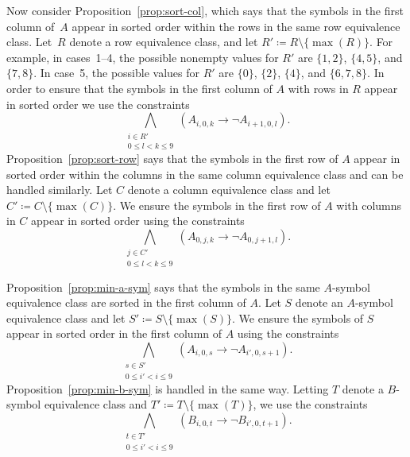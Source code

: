 \documentclass[runningheads]{llncs}
\newcommand{\limp}{\mathbin\rightarrow}
\begin{document}
Now consider Proposition~\ref{prop:sort-col}, which says that the symbols in the
first column of~$A$ appear in sorted order within the rows in the same row
equivalence class.
Let~$R$ denote a row equivalence class, and let $R'\coloneqq R\setminus\{\max(R)\}$.  For example,
in cases~1--4, the possible nonempty values for $R'$ are $\{1,2\}$, $\{4,5\}$, and $\{7,8\}$.
In case~5, the possible values for $R'$ are $\{0\}$, $\{2\}$, $\{4\}$, and $\{6,7,8\}$.
In order to ensure that the symbols in the first column of $A$ with rows in $R$ appear in sorted order we
use the constraints
\begin{equation} \bigwedge_{\substack{i\in R'\\0\leq l<k\leq9}}(A_{i,0,k}\limp\lnot A_{i+1,0,l}) . \end{equation}
Proposition~\ref{prop:sort-row} says that the symbols in the first row of $A$ appear in
sorted order within the columns in the same column equivalence class and can be handled similarly.
Let $C$ denote a column equivalence class and let $C'\coloneqq C\setminus\{\max(C)\}$.  We ensure
the symbols in the first row of $A$ with columns in $C$ appear in sorted order using the constraints
\begin{equation} \bigwedge_{\substack{j\in C'\\0\leq l<k\leq9}}(A_{0,j,k}\limp\lnot A_{0,j+1,l}) . \end{equation}

Proposition~\ref{prop:min-a-sym} says that the symbols in the same $A$-symbol equivalence
class are sorted in the first column of $A$.  Let $S$ denote an $A$-symbol equivalence class
and let $S'\coloneqq S\setminus\{\max(S)\}$.  We ensure the symbols of $S$ appear in sorted
order in the first column of $A$ using the constraints
\begin{equation} \bigwedge_{\substack{s\in S'\\0\leq i'<i\leq9}}(A_{i,0,s}\limp\lnot A_{i',0,s+1}) . \end{equation}
Proposition~\ref{prop:min-b-sym} is handled in the same way.  Letting $T$ denote a $B$-symbol
equivalence class and $T'\coloneqq T\setminus\{\max(T)\}$, we use the constraints
\begin{equation} \bigwedge_{\substack{t\in T'\\0\leq i'<i\leq9}}(B_{i,0,t}\limp\lnot B_{i',0,t+1}) . \end{equation}
\end{document}
